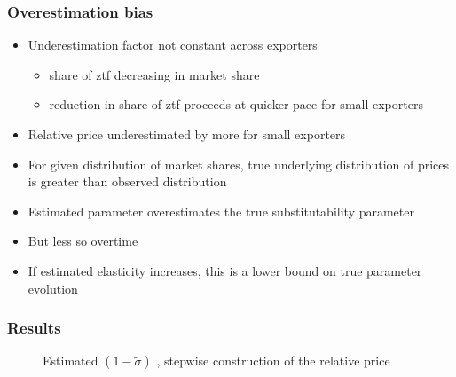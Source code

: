 \documentclass{beamer}
\begin{document}
\begin{frame}[plain]\frametitle{Overestimation bias}
\begin{itemize}
\item Underestimation factor not constant across exporters 
\begin{itemize}
\item share of ztf decreasing in market share
\item reduction in share of ztf proceeds at quicker pace for small exporters
\end{itemize}
\item Relative price underestimated by more for small exporters
\item For given distribution of market shares, true underlying distribution of prices is greater than observed distribution
\item Estimated parameter overestimates the true substitutability parameter
\item But less so overtime
\item If estimated elasticity increases, this is a lower bound on true parameter evolution
\end{itemize}
\end{frame}
\begin{frame}[plain]\frametitle{Results}
\begin{figure}[h!]
\begin{center}
\setlength{\fboxrule}{1pt} %
\setlength{\fboxsep}{.1in} %
\end{center}
\caption{Estimated $(1-\widetilde{\sigma})$  {, stepwise construction of the relative price} \fi \label{fig:elastreal0}}
\end{figure}
\end{frame}
\end{document}
